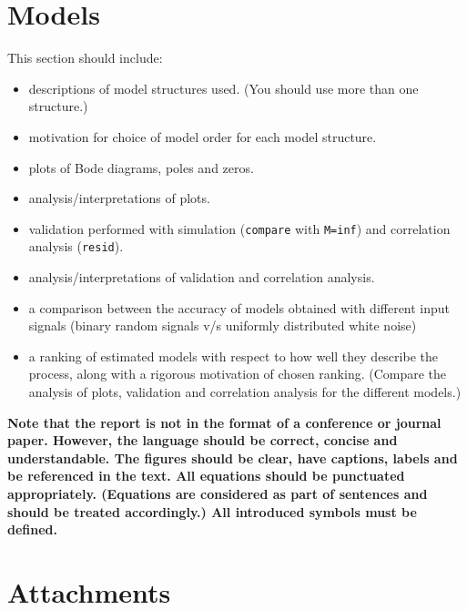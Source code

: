 \documentclass[10pt,a4paper]{article}
\begin{document}
\section{Models}
This section should include:
\begin{itemize}
    \item descriptions of model structures used. (You should use more than one structure.)
    \item motivation for choice of model order for each model structure.
    \item plots of Bode diagrams, poles and zeros.
    \item analysis/interpretations of plots.
   \item validation performed with simulation (\texttt{compare} with \texttt{M=inf}) and correlation analysis (\texttt{resid}).
   \item analysis/interpretations of validation and correlation analysis.
   \item a comparison between the accuracy of models obtained with different input signals (binary random signals v/s uniformly distributed white noise)
   \item  a ranking of estimated models with respect to how well they describe the process, along with a rigorous motivation of chosen ranking. (Compare the analysis of plots, validation and correlation analysis for the different models.)
\end{itemize}

\newpage
{\bf Note that the report is not in the format of a conference or journal paper. However, the language should be correct, concise and understandable. The figures should be clear, have captions, labels and be referenced in the text. All equations should be punctuated appropriately. (Equations are considered as part of sentences and should be treated accordingly.) All introduced symbols must be defined.}
\section*{Attachments}
	\label{matlabCode}
    
	
	
	
\end{document}
